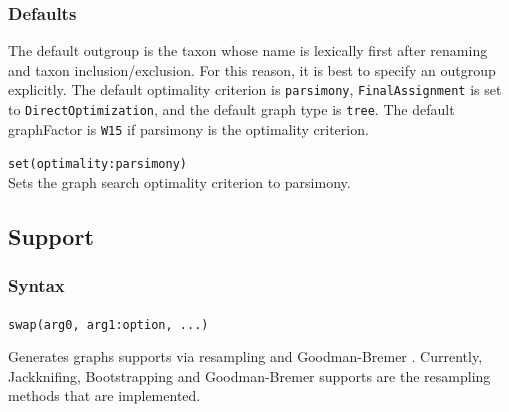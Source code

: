 	\subsubsection{Defaults} 
		The default outgroup is the taxon whose name is 
		lexically first after renaming and taxon inclusion/exclusion. For this reason, it is best to specify 
		an outgroup explicitly. The default optimality criterion is \texttt{parsimony}, 
		\texttt{FinalAssignment} is set to \texttt{DirectOptimization}, and the default 
		graph type is \texttt{tree}. The default graphFactor is \texttt{W15} if parsimony is the optimality 
		criterion.
		
	\begin{example}
		\item{\texttt{set(optimality:parsimony)}\\Sets the graph search optimality criterion to parsimony.}
						
	\end{example}

\subsection{Support}
\label{subsec:support}
	\subsubsection{Syntax}
		\texttt{swap(arg0, arg1:option, ...)}
		
	\begin{phygdescription}
		{Generates graphs supports via resampling \citep{Farrisetal1996} and Goodman-Bremer 
		\citep{Goodmanetal1982, bremer1994}. Currently, Jackknifing, Bootstrapping and 
		Goodman-Bremer supports are the resampling methods that are implemented.}
	\end{phygdescription}
		
